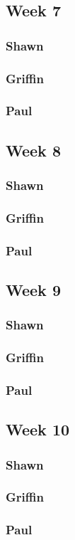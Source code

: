 \documentclass[10pt,draftclsnofoot,onecolumn]{IEEEtran}
\begin{document}
\subsection{Week 7}
\subsubsection{Shawn}
\subsubsection{Griffin}
\subsubsection{Paul}

\subsection{Week 8}
\subsubsection{Shawn}
\subsubsection{Griffin}
\subsubsection{Paul}

\subsection{Week 9}
\subsubsection{Shawn}
\subsubsection{Griffin}
\subsubsection{Paul}

\subsection{Week 10}
\subsubsection{Shawn}
\subsubsection{Griffin}
\subsubsection{Paul}
\end{document}

